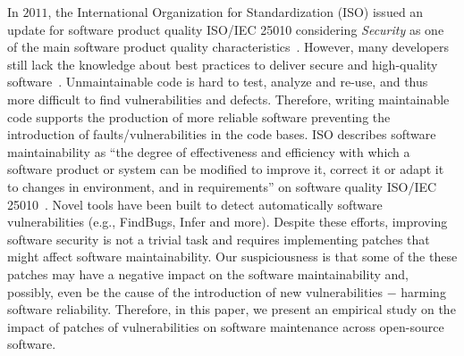\documentclass[10pt,conference]{IEEEtran}
\begin{document}
In $2011$, the International Organization for Standardization (ISO) issued an
update for software product quality ISO/IEC 25010 considering
\emph{Security} as one of the main software product quality characteristics~\cite{iso:2011}. 
However, many developers still lack the knowledge about best practices to deliver secure and high-quality software~\cite{Pothamsetty:2005:SEL:1107622.1107635, 8077802}.
Unmaintainable code is hard to test, analyze and re-use, and thus more difficult
to find vulnerabilities and defects. Therefore, writing maintainable code
supports the production of more reliable software preventing the introduction of 
faults/vulnerabilities in the code bases. ISO describes software 
maintainability as ``the degree of effectiveness and
efficiency with which a software product or system can be modified to improve
it, correct it or adapt it to changes in environment, and in requirements'' on
software quality ISO/IEC 25010~\cite{iso:2011}. Novel tools have been built to 
detect automatically software vulnerabilities (e.g., FindBugs, Infer and more). 
Despite these efforts, improving software security is not a trivial task and requires 
implementing patches that might affect software maintainability. 
Our suspiciousness is that some of the these patches may have a negative 
impact on the software maintainability and, possibly, even be the cause of the 
introduction of new vulnerabilities $-$ harming software reliability. Therefore, 
in this paper, we present an empirical study on the impact of patches of 
vulnerabilities on software maintenance across open-source software.
%
%
\end{document}
